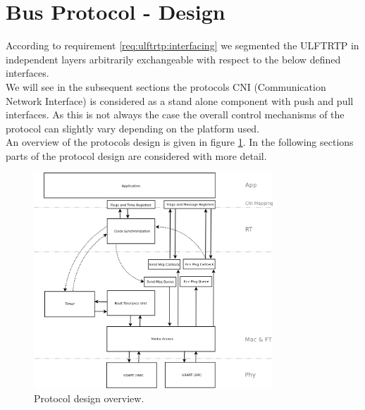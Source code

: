\section{Bus Protocol - Design}
\label{sec:bus:design}

According to requirement \ref{req:ulftrtp:interfacing} we segmented the ULFTRTP in independent layers arbitrarily exchangeable with respect to the below defined interfaces.\\

We will see in the subsequent sections the protocols CNI (Communication Network Interface) is considered as a stand alone component with push and pull interfaces.
As this is not always the case the overall control mechanisms of the protocol can slightly vary depending on the platform used.\\

An overview of the protocols design is given in figure \ref{fig:bus:design:overview}. In the following sections parts of the protocol design are considered with more detail.

\begin{figure}[h]
\centering
\includegraphics[width=0.8\textwidth]{images/protocol_design_overview.png}
\caption{Protocol design overview.}
\label{fig:bus:design:overview}
\end{figure}






